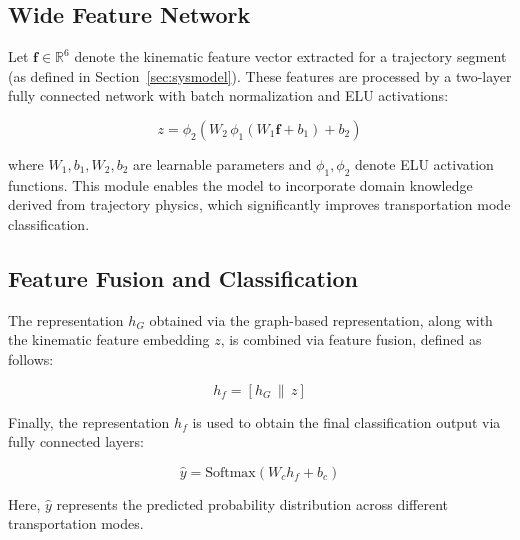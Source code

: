 \documentclass[conference]{IEEEtran}
\begin{document}
\subsection{Wide Feature Network}
Let $\mathbf{f} \in \mathbb{R}^{6}$ denote the kinematic feature vector extracted for a trajectory segment (as defined in Section~\ref{sec:sysmodel}). These features are processed by a two-layer fully connected network with batch normalization and ELU activations:

\begin{equation}
z = \phi_2\!\left(W_2\, \phi_1(W_1 \mathbf{f} + b_1) + b_2\right)
\end{equation}

where $W_1, b_1, W_2, b_2$ are learnable parameters and $\phi_1, \phi_2$ denote ELU activation functions. This module enables the model to incorporate domain knowledge derived from trajectory physics, which significantly improves transportation mode classification.

\subsection{Feature Fusion and Classification}

The representation $h_G$ obtained via the graph-based representation, along with the kinematic feature embedding $z$, is combined via feature fusion, defined as follows:

\begin{equation}
h_f = [h_G \, \| \, z]
\end{equation}

Finally, the representation $h_f$ is used to obtain the final classification output via fully connected layers:

\begin{equation}
\hat{y} = \text{Softmax}(W_c h_f + b_c)
\end{equation}

Here, $\hat{y}$ represents the predicted probability distribution across different transportation modes.
\end{document}
